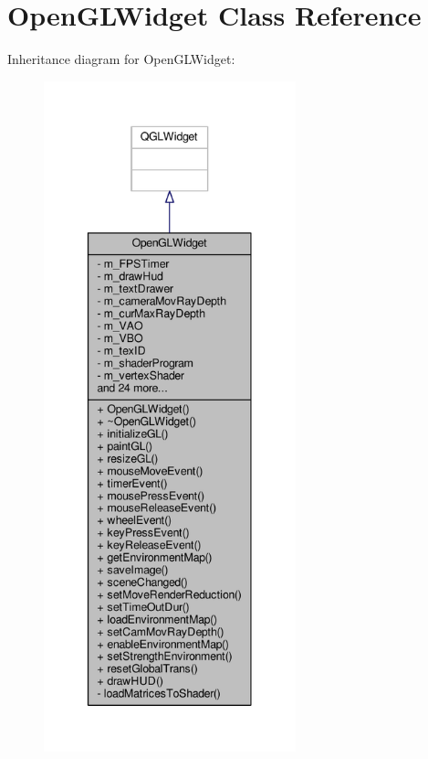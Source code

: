 \hypertarget{class_open_g_l_widget}{\section{Open\-G\-L\-Widget Class Reference}
\label{class_open_g_l_widget}
}


Inheritance diagram for Open\-G\-L\-Widget\-:
\nopagebreak
\begin{figure}[H]
\begin{center}
\leavevmode
\includegraphics[height=550pt]{class_open_g_l_widget__inherit__graph}
\end{center}
\end{figure}


